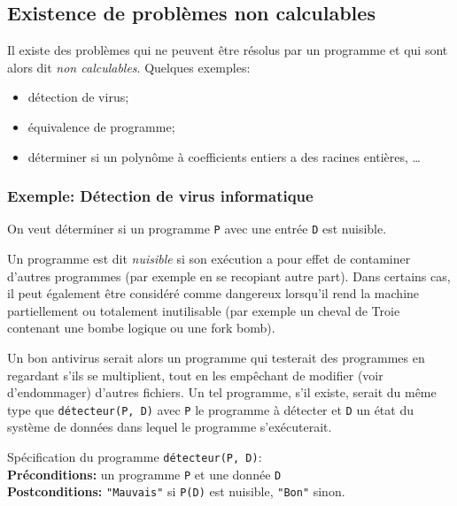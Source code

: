 \subsection{Existence de problèmes non calculables}
\label{subsec:existence_de_problemes_non_calculables}

Il existe des problèmes qui ne peuvent être résolus par un programme et qui sont alors dit \emph{non calculables}.
Quelques exemples:
\begin{itemize}
	\item détection de virus;
	\item équivalence de programme;
	\item déterminer si un polynôme à coefficients entiers a des racines entières, \ldots
\end{itemize}


\subsubsection{Exemple: Détection de virus informatique}
\label{subsubsec:detection_de_virus_informatique}
On veut déterminer si un programme \lstinline|P| avec une entrée \lstinline|D| est nuisible.

\begin{mydef}
	Un programme est dit \emph{nuisible} si son exécution a pour effet de contaminer d'autres programmes (par exemple en se recopiant autre part). Dans certains cas, il peut également être considéré comme dangereux lorsqu'il rend la machine partiellement ou totalement inutilisable (par exemple un cheval de Troie contenant une bombe logique ou une fork bomb).
\end{mydef}

Un bon antivirus serait alors un programme qui testerait des programmes en regardant s'ils se multiplient, tout en les empêchant de modifier (voir d'endommager) d'autres fichiers. Un tel programme, s'il existe, serait du même type que \lstinline|détecteur(P, D)| avec \lstinline|P| le programme à détecter et \lstinline|D| un état du système de données dans lequel le programme s'exécuterait.

\noindent Spécification du programme \lstinline|détecteur(P, D)|:\\
\textbf{Préconditions:} un programme \lstinline|P| et une donnée \lstinline|D|\\
\textbf{Postconditions:} \lstinline|"Mauvais"| si \lstinline|P(D)| est nuisible, \lstinline|"Bon"| sinon.


